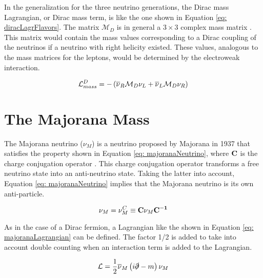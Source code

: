 In the generalization for the three neutrino generations, the Dirac mass Lagrangian, or Dirac mass term, is like the one shown in Equation \ref{eq: diracLagrFlavors}. The matrix $\mathcal{M}_{D}$ is in general a $3 \times 3$ complex mass matrix \cite{NeutrinoMass}. This matrix would contain the mass values corresponding to a Dirac coupling of the neutrinos if a neutrino with right helicity existed. These values, analogous to the mass matrices for the leptons, would be determined by the electroweak interaction. 

\begin{equation}\label{eq: diracLagrFlavors}
\mathcal{L}_{mass}^{D} = -\left(\overline{\nu}_{R}\mathcal{M}_{D}\nu_{L} + \overline{\nu}_{L}\mathcal{M}_{D}\nu_{R}\right)
\end{equation}


\section{The Majorana Mass}

The Majorana neutrino ($\nu_{M}$) is a neutrino proposed by Majorana in 1937 that satisfies the property shown in Equation \ref{eq: majoranaNeutrino}, where $\mathbf{C}$ is the charge conjugation operator \cite{NeutrinoMass}. This charge conjugation operator transforms a free neutrino state into an anti-neutrino state. Taking the latter into account, Equation \ref{eq: majoranaNeutrino} implies that the Majorana neutrino is its own anti-particle. 

\begin{equation}\label{eq: majoranaNeutrino}
\nu_{M} = \nu^{C}_{M} \equiv \mathbf{C}\nu_{M}\mathbf{C^{-1}}
\end{equation}

As in the case of a Dirac fermion, a Lagrangian like the shown in Equation \ref{eq: majoranaLagrangian} can be defined. The factor 1/2 is added to take into account double counting when an interaction term is added to the Lagrangian.   

\begin{equation}\label{eq: majoranaLagrangian}
\mathcal{L} = \frac{1}{2}\overline{\nu}_{M}\left(i\slashed{\partial} - m\right)\nu_{M}
\end{equation}

